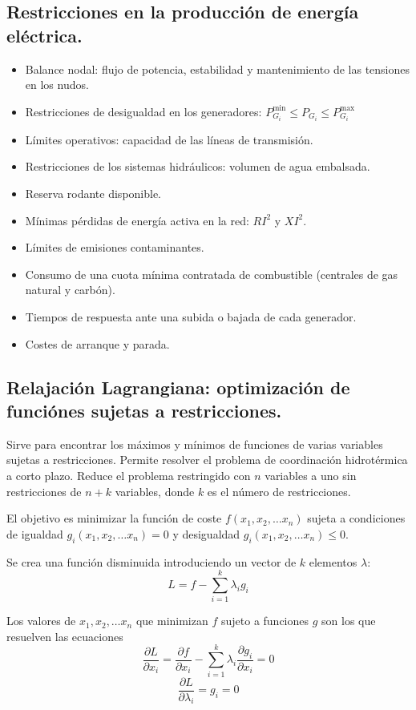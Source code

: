 		\newpage
		\subsection{Restricciones en la producción de energía eléctrica.}
			\begin{itemize}
				\item Balance nodal: flujo de potencia, estabilidad y mantenimiento de las tensiones en los nudos.
				\item Restricciones de desigualdad en los generadores: $P_{G_i}^{\text{min}} \leq P_{G_i} \leq P_{G_i}^{\text{max}}$
				\item Límites operativos: capacidad de las líneas de transmisión.
				\item Restricciones de los sistemas hidráulicos: volumen de agua embalsada.
				\item Reserva rodante disponible.
				\item Mínimas pérdidas de energía activa en la red: $RI^2$ y $XI^2$.
				\item Límites de emisiones contaminantes.
				\item Consumo de una cuota mínima contratada de combustible (centrales de gas natural y carbón).
				\item Tiempos de respuesta ante una subida o bajada de cada generador.
				\item Costes de arranque y parada.
			\end{itemize}
			
		\subsection{Relajación Lagrangiana: optimización de funciónes sujetas a restricciones.}
			Sirve para encontrar los máximos y mínimos de funciones de
			varias variables sujetas a restricciones. Permite resolver el problema de coordinación hidrotérmica a
			corto plazo. Reduce el problema restringido con $n$ variables a uno sin restricciones de $n + k$ variables,
			donde $k$ es el número de restricciones.
			
			
			El objetivo es minimizar la función de coste $f(x_1, x_2,\dots x_n)$ sujeta a condiciones de igualdad $g_i(x_1,x_2,\dots x_n) = 0$ y desigualdad $g_i(x_1,x_2,\dots x_n) \leq 0$.
			
			
			Se crea una función disminuida introduciendo un vector de $k$ elementos $\lambda$:
			\[L = f - \sum_{i=1}^{k} \lambda_i g_i\]
			
			Los valores de $x_1,x_2,\dots x_n$ que minimizan $f$ sujeto a funciones $g$ son los que resuelven las ecuaciones
			\[\dfrac{\partial L}{\partial x_i} = \dfrac{\partial f}{\partial x_i} - \sum_{i=1}^{k} \lambda_i \dfrac{\partial g_i}{\partial x_i} = 0\]
			\[\dfrac{\partial L}{\partial \lambda_i} = g_i = 0\]
			
